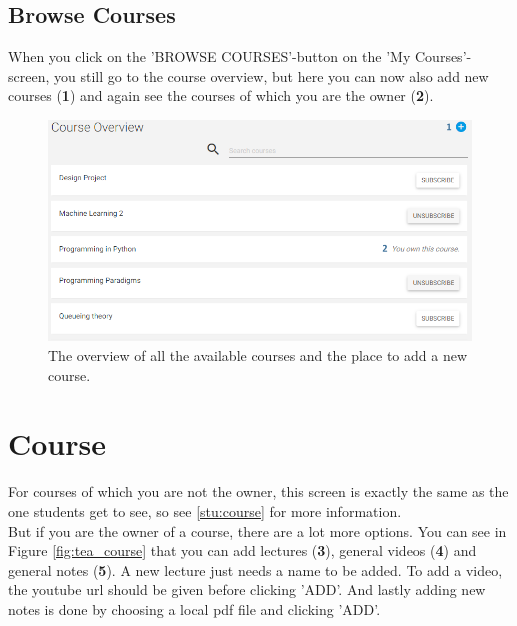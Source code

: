 \documentclass[a4paper,11pt]{report}
\begin{document}
\subsection{Browse Courses}
When you click on the 'BROWSE COURSES'-button on the 'My Courses'-screen, you still go to the course overview, but here you can now also add new courses (\textbf{1}) and again see the courses of which you are the owner (\textbf{2}).

\begin{figure}[H]
\centering
\includegraphics[scale=0.5]{imgs/tea_course_overview.png}
\caption{The overview of all the available courses and the place to add a new course.}
\label{fig:tea_course_overview}
\end{figure}

\section{Course}
\label{tea:course}
For courses of which you are not the owner, this screen is exactly the same as the one students get to see, so see \ref{stu:course} for more information.\\
But if you are the owner of a course, there are a lot more options. You can see in Figure \ref{fig:tea_course} that you can add lectures (\textbf{3}), general videos (\textbf{4}) and general notes (\textbf{5}). A new lecture just needs a name to be added. To add a video, the youtube url should be given before clicking 'ADD'. And lastly adding new notes is done by choosing a local pdf file and clicking 'ADD'.
\end{document}

